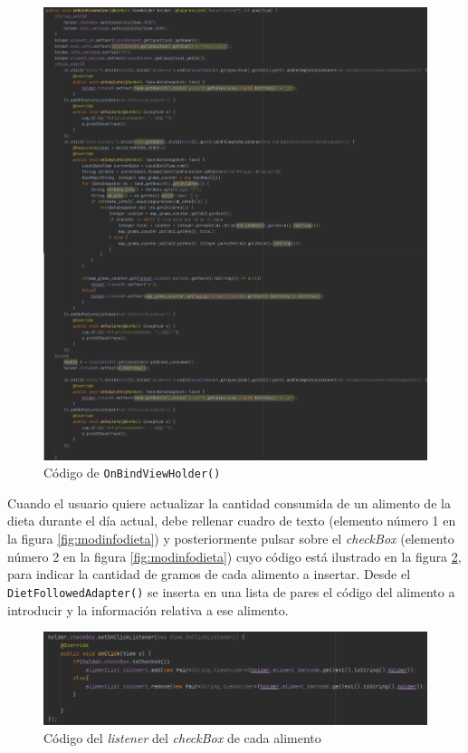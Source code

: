 \begin{figure}[H]
    \centering
    \includegraphics[width=\textwidth]{Images/Capitulo7/onbindview.png}
    \caption{Código de \texttt{OnBindViewHolder()}}
    \label{fig:onbindview}
\end{figure}

Cuando el usuario quiere actualizar la cantidad consumida de un alimento de la dieta durante el día actual, debe rellenar cuadro de texto (elemento número 1 en la figura \ref{fig:modinfodieta}) y posteriormente pulsar sobre el \textit{checkBox} (elemento número 2 en la figura \ref{fig:modinfodieta}) cuyo código está ilustrado en la figura \ref{fig:alimentlistto}, para indicar la cantidad de gramos de cada alimento a insertar. Desde el \texttt{DietFollowedAdapter()} se inserta en una lista de pares el código del alimento a introducir y la información relativa a ese alimento.

\begin{figure}[H]
    \centering
    \includegraphics[width=\textwidth]{Images/Capitulo7/alimentlistto.png}
    \caption{Código del \textit{listener} del \textit{checkBox} de cada alimento}
    \label{fig:alimentlistto}
\end{figure}

